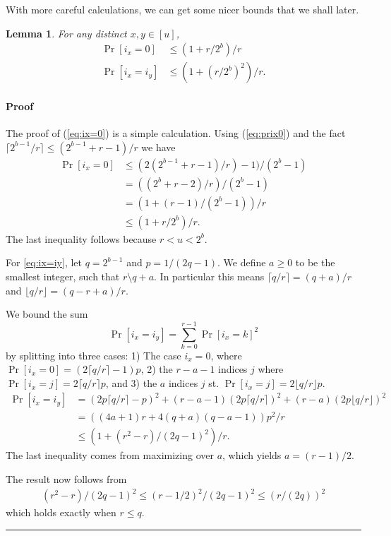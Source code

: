 \documentclass[12pt]{article}
\newcommand{\floor}[1]{\lfloor {#1} \rfloor}
\newcommand{\req}[1]{(\ref{#1})}
\newtheorem {lemma} {Lemma}[section]
\newcommand{\qed}{\rule{1ex}{1ex}}
\newenvironment{proof}[1][]{\paragraph*{Proof{#1}}}{\hfill \qed\smallskip\\}
\newcommand\ceil[1]{\lceil {#1}\rceil}
\begin{document}
With
more careful calculations, we can get some nicer bounds
that we shall later.
\begin{lemma}\label{lem:ix-r-dist} For any distinct $x,y\in [u]$, 
\begin{align}
\Pr[i_x=0]&\le(1+r/2^b)/r\label{eq:ix=0}\\
\Pr[i_x=i_y]&\leq \left(1+(r/2^b)^2\right)/r.\label{eq:ix=iy}
\end{align}
\end{lemma}
\begin{proof}
The proof of \req{eq:ix=0} is a simple calculation.
Using \req{eq:prix0} and the fact $\ceil{2^{b-1}/r}\le(2^{b-1}+r-1)/r$ we have
\begin{align*}
\Pr[i_x=0]&\le (2(2^{b-1}+r-1)/r)-1)/(2^{b}-1)\\
&=((2^b+r-2)/r)/(2^b-1)\\
&=\left(1+(r-1)/(2^b-1)\right)/r\\
&\le\left(1+r/2^b\right)/r.
\end{align*}
The last inequality follows because $r<u<2^b$.

For \ref{eq:ix=iy},
let $q=2^{b-1}$ and $p=1/(2q-1)$.
We define $a\ge 0$ to be the smallest integer, such that $r\setminus q+a$.
In particular this means 
$\lceil q/r\rceil = (q+a)/r$ and
$\lfloor q/r\rfloor = (q-r+a)/r$.

We bound the sum
$$
   \Pr[i_x=i_y]
   = \sum_{k=0}^{r-1} \Pr[i_x = k]^2
$$
by splitting into three cases:
1) The case $i_x=0$, where $\Pr[i_x=0]=(2\ceil{q/r}-1)p$,
2) the $r-a-1$ indices $j$ where $\Pr[i_x=j]=2\ceil{q/r}p$,
and 3) the $a$ indices $j$ st. $\Pr[i_x=j]=2\floor{q/r}p$.
\begin{align*}
   \Pr[i_x=i_y]
   &=
   (2p\ceil{ q/r}-p)^2 + (r-a-1) (2p \lceil q/r\rceil)^2 + (r-a) (2p \lfloor q/r \rfloor)^2
    \\&= ((4a+1)r+4(q+a)(q-a-1))p^2/r
   \\&\le (1 + (r^2-r)/(2q-1)^2) / r.
\end{align*}
The last inequality comes from maximizing over $a$, which yields $a=(r-1)/2$.

The result now follows from
\begin{align}
   (r^2-r)/(2q-1)^2
   \le
   (r-1/2)^2/(2q-1)^2
   \le
   (r/(2q))^2
\end{align}
which holds exactly when $r\le q$.



\end{proof}
\end{document}
